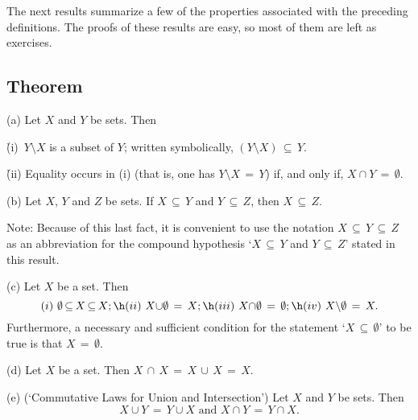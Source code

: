 \VV

        The next results summarize a few of the properties associated with the preceding definitions.
    The proofs of these results are easy, so most of them are left as exercises.

\V
\V

            \subsection{\small{\bf Theorem}}
            \label{ThmA10.25}

\hspace*{\parindent}
        (a) Let $X$ and $Y$ be sets. Then

        \h (i)\, $Y{\setminus}X$ is a subset of $Y$; written symbolically, $(Y{\setminus}X)\,{\subseteq}\,Y$.

        \h (ii) Equality occurs in (i) (that is, one has $Y{\setminus}X \,=\, Y$) if, and only if, $X{\cap}Y \,=\, {\emptyset}$.

\V

        (b) Let $X$, $Y$ and $Z$ be sets. If $X \,{\subseteq}\, Y$ and $Y \,{\subseteq}\, Z$, then $X \,{\subseteq}\, Z$.

        Note: Because of this last fact, it is convenient to use the notation $X \,{\subseteq}\, Y \,{\subseteq}\, Z$
    as an abbreviation for the compound hypothesis `$X \,{\subseteq}\, Y$ and $Y \,{\subseteq}\, Z$' stated in this result.

\V

        (c) Let $X$ be a set. Then
        \begin{displaymath}
         (i)\,\, {\emptyset} \,{\subseteq}\, X \,{\subseteq}\, X; \h
         (ii)\,\, X{\cup}{\emptyset} \,=\, X; \h
         (iii)\,\,  X{\cap}{\emptyset} \,=\, {\emptyset}; \h
         (iv)\, \, X{\setminus}{\emptyset} \,=\, X.
        \end{displaymath}
    Furthermore, a necessary and sufficient condition for the statement `$X \,{\subseteq}\, {\emptyset}$' to be true is that $X \,=\, {\emptyset}$.

\V

        (d) Let $X$ be a set. Then $X\,{\cap}\,X \,=\, X\,{\cup}\,X \,=\, X$.

\V

        (e) (`Commutative Laws for Union and Intersection') Let $X$ and $Y$ be sets. Then
        \begin{displaymath}
        X{\cup}Y \,=\, Y{\cup}X \mbox{ and } X{\cap}Y \,=\, Y{\cap}X.
        \end{displaymath}

